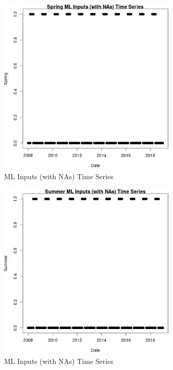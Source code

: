 \begin{figure} 
\centering  
\includegraphics[width=0.77\textwidth]{Code_Outputs/Report_ML_input_PM25_Step4_part_f_de_duplicated_aveswNAs_SpringvDate.jpg} 
\caption{\label{fig:Report_ML_input_PM25_Step4_part_f_de_duplicated_aveswNAsSpringvDate}ML Inputs (with NAs) Time Series} 
\end{figure} 
 

\begin{figure} 
\centering  
\includegraphics[width=0.77\textwidth]{Code_Outputs/Report_ML_input_PM25_Step4_part_f_de_duplicated_aveswNAs_SummervDate.jpg} 
\caption{\label{fig:Report_ML_input_PM25_Step4_part_f_de_duplicated_aveswNAsSummervDate}ML Inputs (with NAs) Time Series} 
\end{figure} 
 

